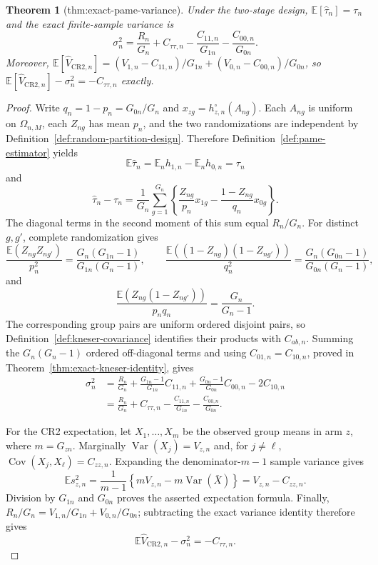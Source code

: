 \documentclass{article}
\newtheorem{theorem}{Theorem}
\begin{document}
\begin{theorem}[thm:exact-pame-variance]\label{thm:exact-pame-variance}
Under the two-stage design, \(\mathbb E[\widehat\tau_n]=\tau_n\) and the exact finite-sample variance is \[\sigma_n^2=\frac{R_n}{G_n}+C_{\tau\tau,n}-\frac{C_{11,n}}{G_{1n}}-\frac{C_{00,n}}{G_{0n}}.\] Moreover, \(\mathbb E[\widehat V_{\mathrm{CR2},n}]=(V_{1,n}-C_{11,n})/G_{1n}+(V_{0,n}-C_{00,n})/G_{0n}\), so \(\mathbb E[\widehat V_{\mathrm{CR2},n}]-\sigma_n^2=-C_{\tau\tau,n}\) exactly.
\end{theorem}
\begin{proof}
Write \(q_n=1-p_n=G_{0n}/G_n\) and \(x_{zg}=h_{z,n}^{\circ}(A_{ng})\).  Each \(A_{ng}\) is uniform on \(\Omega_{n,M}\), each \(Z_{ng}\) has mean \(p_n\), and the two randomizations are independent by Definition~\ref{def:random-partition-design}.  Therefore Definition~\ref{def:pame-estimator} yields
\[
 \mathbb E\widehat\tau_n
 =\mathbb E_nh_{1,n}-\mathbb E_nh_{0,n}=\tau_n
\]
and
\[
 \widehat\tau_n-\tau_n
 =\frac1{G_n}\sum_{g=1}^{G_n}
 \left\{\frac{Z_{ng}}{p_n}x_{1g}
 -\frac{1-Z_{ng}}{q_n}x_{0g}\right\}.
\]
The diagonal terms in the second moment of this sum equal \(R_n/G_n\).  For distinct \(g,g'\), complete randomization gives
\[
 \frac{\mathbb E(Z_{ng}Z_{ng'})}{p_n^2}
 =\frac{G_n(G_{1n}-1)}{G_{1n}(G_n-1)},\qquad
 \frac{\mathbb E((1-Z_{ng})(1-Z_{ng'}))}{q_n^2}
 =\frac{G_n(G_{0n}-1)}{G_{0n}(G_n-1)},
\]
and
\[
 \frac{\mathbb E(Z_{ng}(1-Z_{ng'}))}{p_nq_n}
 =\frac{G_n}{G_n-1}.
\]
The corresponding group pairs are uniform ordered disjoint pairs, so Definition~\ref{def:kneser-covariance} identifies their products with \(C_{ab,n}\).  Summing the \(G_n(G_n-1)\) ordered off-diagonal terms and using \(C_{01,n}=C_{10,n}\), proved in Theorem~\ref{thm:exact-kneser-identity}, gives
\[
 \begin{aligned}
 \sigma_n^2
 &=\frac{R_n}{G_n}
   +\frac{G_{1n}-1}{G_{1n}}C_{11,n}
   +\frac{G_{0n}-1}{G_{0n}}C_{00,n}-2C_{10,n}\\
 &=\frac{R_n}{G_n}+C_{\tau\tau,n}
   -\frac{C_{11,n}}{G_{1n}}-\frac{C_{00,n}}{G_{0n}}.
 \end{aligned}
\]

For the CR2 expectation, let \(X_1,\ldots,X_m\) be the observed group means in arm \(z\), where \(m=G_{zn}\).  Marginally \(\operatorname{Var}(X_j)=V_{z,n}\) and, for \(j\ne\ell\), \(\operatorname{Cov}(X_j,X_\ell)=C_{zz,n}\).  Expanding the denominator-\(m-1\) sample variance gives
\[
 \mathbb E s_{z,n}^2
 =\frac1{m-1}\left\{mV_{z,n}-m\operatorname{Var}(\bar X)\right\}
 =V_{z,n}-C_{zz,n}.
\]
Division by \(G_{1n}\) and \(G_{0n}\) proves the asserted expectation formula.  Finally, \(R_n/G_n=V_{1,n}/G_{1n}+V_{0,n}/G_{0n}\); subtracting the exact variance identity therefore gives
\[
 \mathbb E\widehat V_{\mathrm{CR2},n}-\sigma_n^2=-C_{\tau\tau,n}.
\]
\end{proof}
\end{document}
